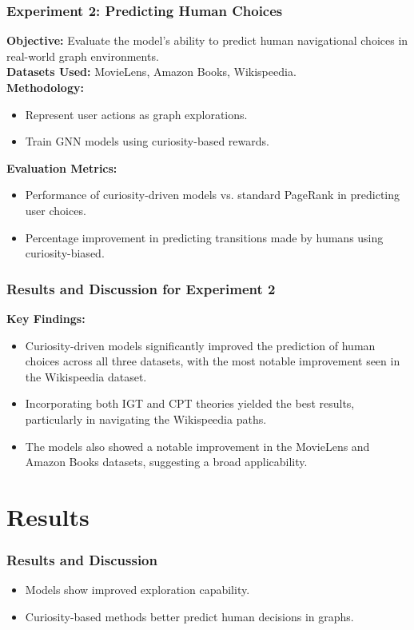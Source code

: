 \documentclass{beamer}
\begin{document}
\begin{frame}
\frametitle{Experiment 2: Predicting Human Choices}
\textbf{Objective:} Evaluate the model's ability to predict human navigational choices in real-world graph environments.\\
\textbf{Datasets Used:} MovieLens, Amazon Books, Wikispeedia.\\
\textbf{Methodology:}
\begin{itemize}
    \item Represent user actions as graph explorations.
    \item Train GNN models using curiosity-based rewards.
\end{itemize}
\textbf{Evaluation Metrics:}
\begin{itemize}
    \item Performance of curiosity-driven models vs. standard PageRank in predicting user choices.
    \item Percentage improvement in predicting transitions made by humans using curiosity-biased.
\end{itemize}
\end{frame}

\begin{frame}
\frametitle{Results and Discussion for Experiment 2}
\textbf{Key Findings:}
\begin{itemize}
    \item Curiosity-driven models significantly improved the prediction of human choices across all three datasets, with the most notable improvement seen in the Wikispeedia dataset.
    \item Incorporating both IGT and CPT theories yielded the best results, particularly in navigating the Wikispeedia paths.
    \item The models also showed a notable improvement in the MovieLens and Amazon Books datasets, suggesting a broad applicability.
\end{itemize}
\end{frame}

\section{Results}
\begin{frame}
\frametitle{Results and Discussion}
\begin{itemize}
    \item Models show improved exploration capability.
    \item Curiosity-based methods better predict human decisions in graphs.
\end{itemize}
\end{frame}
\end{document}
